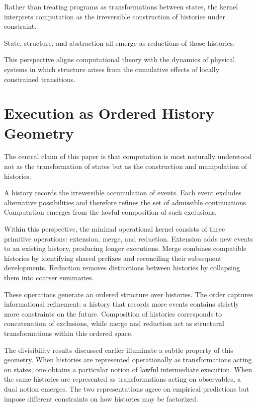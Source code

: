 \documentclass[12pt]{article}
\begin{document}
Rather than treating programs as transformations
between states, the kernel interprets computation
as the irreversible construction of histories
under constraint.

State, structure, and abstraction all emerge
as reductions of those histories.

This perspective aligns computational theory
with the dynamics of physical systems in which
structure arises from the cumulative effects
of locally constrained transitions.

\section{Execution as Ordered History Geometry}

The central claim of this paper is that computation is most naturally
understood not as the transformation of states but as the construction
and manipulation of histories.

A history records the irreversible accumulation of events. Each event
excludes alternative possibilities and therefore refines the set of
admissible continuations. Computation emerges from the lawful
composition of such exclusions.

Within this perspective, the minimal operational kernel consists of
three primitive operations: extension, merge, and reduction. Extension
adds new events to an existing history, producing longer executions.
Merge combines compatible histories by identifying shared prefixes and
reconciling their subsequent developments. Reduction removes distinctions
between histories by collapsing them into coarser summaries.

These operations generate an ordered structure over histories. The order
captures informational refinement: a history that records more events
contains strictly more constraints on the future. Composition of
histories corresponds to concatenation of exclusions, while merge and
reduction act as structural transformations within this ordered space.

The divisibility results discussed earlier illuminate a subtle property
of this geometry. When histories are represented operationally as
transformations acting on states, one obtains a particular notion of
lawful intermediate execution. When the same histories are represented
as transformations acting on observables, a dual notion emerges. The two
representations agree on empirical predictions but impose different
constraints on how histories may be factorized.
\end{document}

